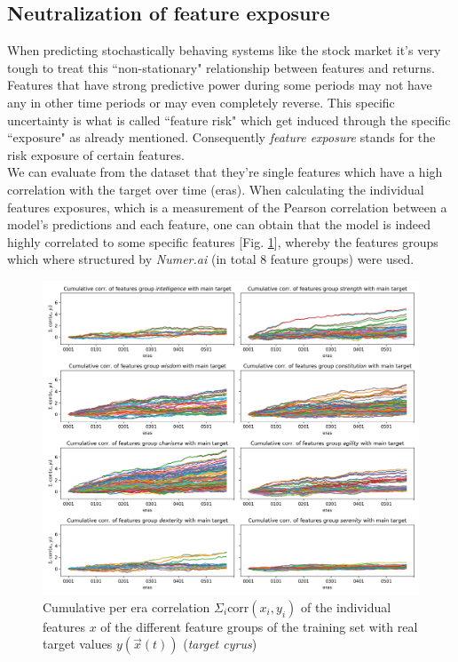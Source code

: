 \documentclass[12pt, a4paper]{article}
\begin{document}
\subsection{Neutralization of feature exposure}
\label{sec: neutralizing}
When predicting stochastically behaving systems like the stock market it's very tough to treat this ``non-stationary" relationship between features and returns. Features that have strong predictive power during some periods may not have any in other time periods or may even completely reverse. This specific uncertainty is what is called ``feature risk" which get induced through the specific ``exposure" as already mentioned. Consequently \textit{feature exposure} stands for the risk exposure of certain features. \\
We can evaluate from the dataset that they're single features which have a high correlation with the target over time (eras). When calculating the individual features exposures, which is a measurement of the Pearson correlation between a model's predictions and each feature, one can obtain that the model is indeed highly correlated to some specific features [Fig. \ref{fig: per_era_correlation}], whereby the features groups which where structured by \textit{Numer.ai} (in total 8 feature groups) were used.
\begin{figure}[!htpb]%
    \centering
    \includegraphics[width=1\textwidth,trim={0 0 0 0},clip]{figures/per_era_correlations.png}
    \caption[Cumulative per era correlation of the different feature groups]{Cumulative per era correlation $\Sigma_i \text{corr}(x_i,y_i)$ of the individual features $x$ of the different feature groups of the training set with real target values $y(\vec{x}(t))$ (\textit{target cyrus}) }
    \label{fig: per_era_correlation}
\end{figure}
\end{document}
